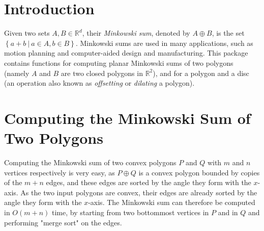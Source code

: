 \section{Introduction\label{mink_sec:intro}}
 
Given two sets $A,B \in \mathbb{R}^d$, their \emph{Minkowski sum},
denoted by $A \oplus B$, is the set $\left\{ a + b ~|~ a \in
A, b \in B \right\}$. Minkowski sums are used in many applications,
such as motion planning and computer-aided design and
manufacturing. This package contains functions for computing planar
Minkowski sums of two polygons (namely $A$ and $B$ are two closed
polygons in $\mathbb{R}^2$), and for a polygon and a disc (an operation
also known as \emph{offsetting} or \emph{dilating} a polygon).

\section{Computing the Minkowski Sum of Two Polygons\label{mink_sec:sum_poly}}

Computing the Minkowski sum of two convex polygons $P$ and $Q$ with
$m$ and $n$ vertices respectively is very easy, as $P \oplus Q$ is a
convex polygon bounded by copies of the $m + n$ edges, and these edges
are sorted by the angle they form with the $x$-axis. As the two
input polygons are convex, their edges are already sorted by the
angle they form with the $x$-axis. The Minkowski sum can therefore be
computed in $O(m + n)$ time, by starting from two bottommost vertices
in $P$ and in $Q$ and performing "merge sort" on the edges.

